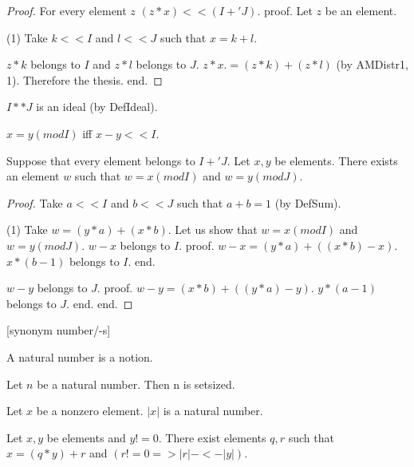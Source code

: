 \documentclass{article}
\begin{document}
\begin{forthel}
\begin{proof}
      For every element $z$ $(z * x) << (I +' J)$.
      proof.
        Let $z$ be an element.

        (1) Take $k << I$ and $l << J$ such that $x = k + l$.

        $z * k$ belongs to $I$ and $z * l$ belongs to $J$. $z * x .= (z * k) + (z * l)$ (by AMDistr1, 1). Therefore the thesis.
      end.
    \end{proof}


    \begin{lemma}[IdeInt]
      $I ** J$ is an ideal (by DefIdeal).
    \end{lemma}

    \begin{definition}[DefMod]
      $x = y (mod I)$ iff $x - y << I$.
    \end{definition}

    \begin{theorem}[ChineseRemainder]
      Suppose that every element belongs to $I +' J$. Let $x, y$ be elements. There exists an element $w$ such that $w = x (mod I)$ and $w = y (mod J)$.
    \end{theorem}
    \begin{proof}
      Take $a << I$ and $b << J$ such that $a + b = 1$ (by DefSum).

      (1) Take $w = (y * a) + (x * b)$.
      Let us show that $w = x (mod I)$ and $w = y (mod J)$.
        $w - x$ belongs to $I$.
        proof.
          $w - x = (y * a) + ((x * b) - x)$. $x * (b - 1)$ belongs to $I$.
        end.

        $w - y$ belongs to $J$.
        proof.
          $w - y = (x * b) + ((y * a) - y)$. $y * (a - 1)$ belongs to $J$.
        end.
      end.
    \end{proof}


    [synonym number/-s]

    \begin{signature}[NatSort]
      A natural number is a notion.
    \end{signature}

    \begin{axiom}
      Let $n$ be a natural number. Then n is setsized.
    \end{axiom}

    \begin{signature}[EucSort]
      Let $x$ be a nonzero element. $|x|$ is a natural number.
    \end{signature}

    \begin{axiom}[Division]
      Let $x,y$ be elements and $y != 0$. There exist elements $q,r$ such that $x = (q * y) + r$ and $(r != 0 => |r| -<- |y|)$.
    \end{axiom}



\end{forthel}
\end{document}
